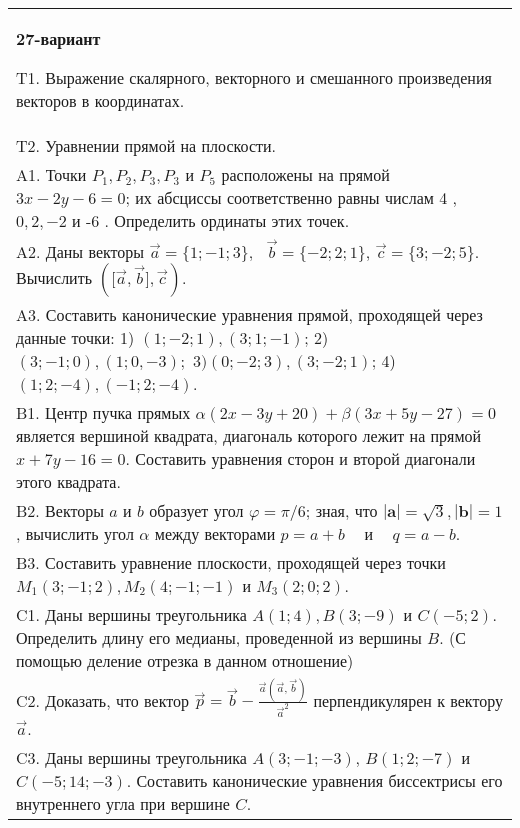 \documentclass{article}
\begin{document}
\begin{tabular}{m{17cm}}
\textbf{27-вариант}
\newline

T1. 
Выражение скалярного, векторного и смешанного произведения векторов в координатах.
 \\
T2. Уравнении прямой на плоскости.
 \\
A1. 
Точки \(P_{1},P_{2},P_{3},P_{3}\) и \(P_{5}\) расположены на прямой \(3x - 2y - 6 = 0\); их абсциссы соответственно равны числам 4 , \(0,2, - 2\) и -6 . Определить ординаты этих точек.
 \\
A2. 
Даны векторы \(\overrightarrow{a} = \{ 1; - 1;3\},\ \ \ \overrightarrow{b} = \{ - 2;2;1\}\), \(\overrightarrow{c} = \{ 3; - 2;5\}\). Вычислить \((\lbrack\overrightarrow{a},\overrightarrow{b}\rbrack,\overrightarrow{c})\).
 \\
A3. 
Составить канонические уравнения прямой, проходящей через данные точки: 1) \((1; - 2;1),(3;1; - 1)\); 2) \((3; - 1;0),(1;0, - 3);\) \(3)(0; - 2;3),(3; - 2;1)\); 4) \((1;2; - 4),( - 1;2; - 4)\).
 \\
B1. 
Центр пучка прямых \(\alpha(2x - 3y + 20) + \beta(3x + 5y - 27) = 0\) является вершиной квадрата, диагональ которого лежит на прямой \(x + 7y - 16 = 0\). Составить уравнения сторон и второй диагонали этого квадрата.
 \\
B2. 
Векторы \(a\) и \(b\) образует угол \(\varphi = \pi/6\); зная, что \(|\mathbf{a}| = \sqrt{3},|\mathbf{b}| = 1\), вычислить угол \(\alpha\) между векторами \(p = a + b\ \ \ \ \) и \(\ \ \ \ q = a - b\).
 \\
B3. 
Составить уравнение плоскости, проходящей через точки \(M_{1}(3; - 1;2),M_{2}(4; - 1; - 1)\) и \(M_{3}(2;0;2)\).
 \\
C1. Даны вершины треугольника \(A(1;4),B(3; - 9)\) и \(C( - 5;2)\). Определить длину его медианы, проведенной из вершины \(B\). (С помощью деление отрезка в данном отношение)
 \\
C2. 
Доказать, что вектор \(\overrightarrow{p} = \overrightarrow{b} - \frac{\overrightarrow{a}(\overrightarrow{a},\overrightarrow{b})}{{\overrightarrow{a}}^{2}}\) перпендикулярен к вектору \(\overrightarrow{a}\).
 \\
C3. 
Даны вершины треугольника \(A(3; - 1; - 3)\), \(B(1;2; - 7)\) и \(C( - 5;14; - 3)\). Составить канонические уравнения биссектрисы его внутреннего угла при вершине \(C\).
 \\

\end{tabular}
\vspace{1cm}
\end{document}
